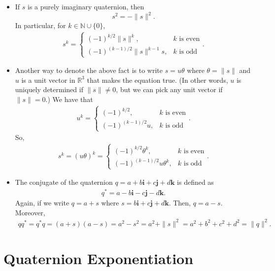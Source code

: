 \documentclass[10pt]{article}
\newcommand{\ve}[1]{\mathbf{#1}}
\newcommand{\Real}{\mathbb{R}}
\begin{document}
\begin{itemize}
    \item If $s$ is a purely imaginary quaternion, then $$s^2 = -\|s\|^2.$$
    In particular, for $k \in \mathbb{N} \cup \{0\}$,
    \begin{align*}
        s^k = \begin{cases}
            (-1)^{k/2} \|s\|^{k}, & \mbox{$k$ is even} \\
            (-1)^{(k-1)/2} \|s\|^{k-1} s, & \mbox{$k$ is odd}
        \end{cases}.
    \end{align*}

    \item Another way to denote the above fact is to write $s = u\theta$ where $\theta = \| s \|$ and $u$ is a unit vector in $\Real^3$ that makes the equation true. (In other words, $u$ is uniquely determined if $\| s \| \neq 0$, but we can pick any unit vector if $\| s \| = 0$.) We have that
    \begin{align*}
        u^k = \begin{cases}
            (-1)^{k/2} , & \mbox{$k$ is even} \\
            (-1)^{(k-1)/2} u, & \mbox{$k$ is odd}
        \end{cases}.
    \end{align*}
    So,
    \begin{align*}
        s^k = (u \theta)^k = \begin{cases}
            (-1)^{k/2} \theta^k , & \mbox{$k$ is even} \\
            (-1)^{(k-1)/2} u \theta^k, & \mbox{$k$ is odd}
        \end{cases}.
    \end{align*}

    \item The conjugate of the quaternion $q = a + b\ve{i} + c\ve{j} + d\ve{k}$ is defined as
    \begin{align*}
        q^* = a - b\ve{i} - c\ve{j} - d\ve{k}.
    \end{align*}
    Again, if we write $q = a + s$ where $s = b\ve{i} + c\ve{j} + d\ve{k}$. Then, $q = a - s$. Moreover,
    \begin{align*}
        qq^* = q^*q = (a + s)(a - s) = a^2 - s^2 = a^2 + \| s \|^2 = a^2 + b^2 + c^2 + d^2 = \|q\|^2.
    \end{align*}    
\end{itemize}

\section{Quaternion Exponentiation}
\end{document}
